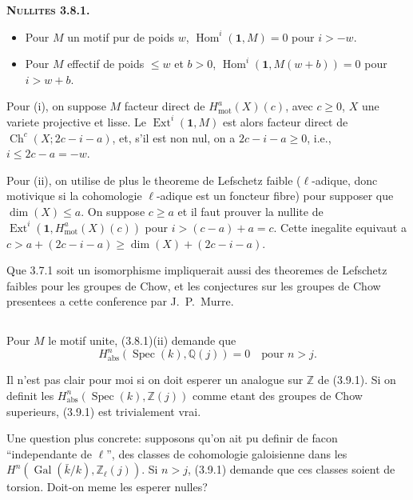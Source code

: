 \documentclass[11pt,a4paper]{article}
\theoremstyle{plain}
\theoremstyle{definition}
\DeclareMathOperator{\Ext}{Ext}
\DeclareMathOperator{\Hom}{Hom}
\DeclareMathOperator{\Spec}{Spec}
\DeclareMathOperator{\Gal}{Gal}
\DeclareMathOperator{\Ch}{Ch}
\newcommand{\Q}{\mathbb{Q}}
\newcommand{\Z}{\mathbb{Z}}
\DeclareMathOperator{\mot}{mot}
\newcommand{\abs}{\mathrm{abs}}
\begin{document}
\textbf{\textsc{Nullites 3.8.1.}}
\begin{itemize}
\item[(i)] Pour $M$ un motif pur de poids $w$, $\Hom^i(\mathbf{1}, M) = 0$ pour $i > -w$.
\item[(ii)] Pour $M$ effectif de poids $\leq w$ et $b > 0$, $\Hom^i(\mathbf{1}, M(w+b)) = 0$ pour $i > w + b$.
\end{itemize}

Pour (i), on suppose $M$ facteur direct de $H^a_{\mot}(X)(c)$, avec $c \geq 0$, $X$ une variete projective et lisse. Le $\Ext^i(\mathbf{1}, M)$ est alors facteur direct de $\Ch^c(X; 2c-i-a)$, et, s'il est non nul, on a $2c - i - a \geq 0$, i.e., $i \leq 2c - a = -w$.

Pour (ii), on utilise de plus le theoreme de Lefschetz faible ($\ell$-adique, donc motivique si la cohomologie $\ell$-adique est un foncteur fibre) pour supposer que $\dim(X) \leq a$. On suppose $c \geq a$ et il faut prouver la nullite de $\Ext^i(\mathbf{1}, H^a_{\mot}(X)(c))$ pour $i > (c-a) + a = c$. Cette inegalite equivaut a $c > a + (2c - i - a) \geq \dim(X) + (2c - i - a)$.

Que 3.7.1 soit un isomorphisme impliquerait aussi des theoremes de Lefschetz faibles pour les groupes de Chow, et les conjectures sur les groupes de Chow presentees a cette conference par J.~P.~Murre.

\subsection{}

Pour $M$ le motif unite, (3.8.1)(ii) demande que
\begin{equation}
\tag{3.9.1}
H^n_{\abs}(\Spec(k), \Q(j)) = 0 \quad \text{pour } n > j.
\end{equation}

Il n'est pas clair pour moi si on doit esperer un analogue sur $\Z$ de (3.9.1). Si on definit les $H^n_{\abs}(\Spec(k), \Z(j))$ comme etant des groupes de Chow superieurs, (3.9.1) est trivialement vrai.

Une question plus concrete: supposons qu'on ait pu definir de facon ``independante de $\ell$'', des classes de cohomologie galoisienne dans les $H^n(\Gal(\bar{k}/k), \Z_\ell(j))$. Si $n > j$, (3.9.1) demande que ces classes soient de torsion. Doit-on meme les esperer nulles?
\end{document}
